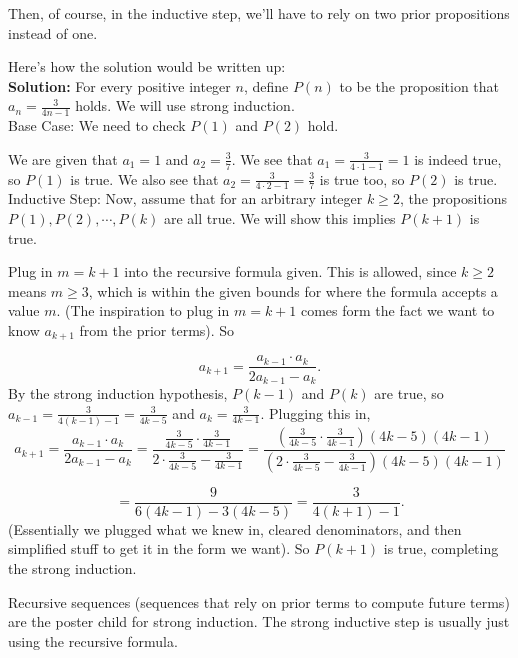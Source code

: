 \documentclass[11pt]{scrartcl}
\begin{document}
Then, of course, in the inductive step, we'll have to rely on two prior propositions instead of one.

Here's how the solution would be written up: \\

\noindent
\textbf{Solution:}
For every positive integer $n$, define $P(n)$ to be the proposition that $a_n = \frac{3}{4n-1}$ holds. We will use strong induction.\\

\noindent
Base Case: We need to check $P(1)$ and $P(2)$ hold.

We are given that $a_1 = 1$ and $a_2 = \frac{3}{7}$. We see that $a_1 = \frac{3}{4 \cdot 1 - 1} = 1$ is indeed true, so $P(1)$ is true. We also see that $a_2 = \frac{3}{4 \cdot 2 - 1} = \frac{3}{7}$ is true too, so $P(2)$ is true. \\

Inductive Step: Now, assume that for an arbitrary integer $k \geq 2$, the propositions $P(1), P(2), \cdots, P(k)$ are all true. We will show this implies $P(k+1)$ is true.

Plug in $m = k + 1$ into the recursive formula given. This is allowed, since $k \geq 2$ means $m \geq 3$, which is within the given bounds for where the formula accepts a value $m$. (The inspiration to plug in $m = k+1$ comes form the fact we want to know $a_{k+1}$ from the prior terms). So

\[a_{k+1} = \frac{a_{k-1} \cdot a_{k}}{2a_{k-1} - a_k}.\] By the strong induction hypothesis, $P(k-1)$ and $P(k)$ are true, so $a_{k-1} = \frac{3}{4(k-1)-1} = \frac{3}{4k-5}$ and $a_k = \frac{3}{4k-1}$. Plugging this in, \[a_{k+1} = \frac{a_{k-1} \cdot a_{k}}{2a_{k-1} - a_k} = \frac{\frac{3}{4k-5} \cdot \frac{3}{4k-1}}{2 \cdot \frac{3}{4k-5} - \frac{3}{4k-1}} = \frac{\left(\frac{3}{4k-5}\cdot\frac{3}{4k-1}\right)(4k-5)(4k-1)}{\left(2\cdot\frac{3}{4k-5}-\frac{3}{4k-1}\right)(4k-5)(4k-1)}\]

\[=\frac{9}{6(4k-1)-3(4k-5)}=\frac{3}{4(k+1)-1}.\] (Essentially we plugged what we knew in, cleared denominators, and then simplified stuff to get it in the form we want). So $P(k+1)$ is true, completing the strong induction.

\begin{advice}
    Recursive sequences (sequences that rely on prior terms to compute future terms) are the poster child for strong induction. The strong inductive step is usually just using the recursive formula.
\end{advice}
\end{document}
